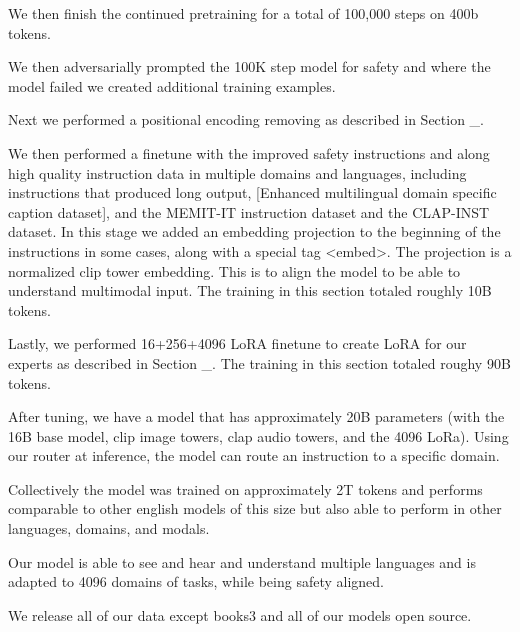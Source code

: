 We then finish the continued pretraining for a total of 100,000 steps on 400b tokens.

We then adversarially prompted the 100K step model for safety and where the model failed we created additional training examples.

Next we performed a positional encoding removing as described in Section \_. 

We then performed a finetune with the improved safety instructions and along high quality instruction data in multiple domains and languages, including instructions that produced long output, [Enhanced multilingual domain specific caption dataset], and the MEMIT-IT instruction dataset and the CLAP-INST dataset.  In this stage we added an embedding projection to the beginning of the instructions in some cases, along with a special tag <embed>. The projection is a normalized clip tower embedding. This is to align the model to be able to understand multimodal input. The training in this section totaled roughly 10B tokens.

Lastly, we performed 16+256+4096 LoRA finetune to create LoRA for our experts as described in Section \_.  The training in this section totaled roughy 90B tokens. 

After tuning, we have a model that has approximately 20B parameters (with the 16B base model, clip image towers, clap audio towers, and the 4096 LoRa). Using our router at inference, the model can route an instruction to a specific domain.

Collectively the model was trained on approximately 2T tokens and performs comparable to other english models of this size but also able to perform in other languages, domains, and modals. 

Our model is able to see and hear and understand multiple languages and is adapted to 4096 domains of tasks, while being safety aligned. 

We release all of our data except books3 and all of our models open source.


\fi